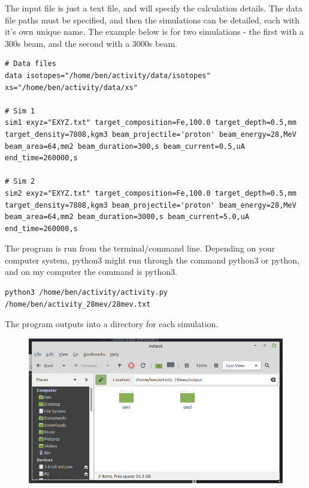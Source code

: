 \documentclass[12pt,twoside]{manual}
\begin{document}
The input file is just a text file, and will specify the calculation details.  The data file paths must be specified, and then the simulations can be detailed, each with it's own unique name.  The example below is for two simulations - the first with a 300s beam, and the second with a 3000s beam.



\FloatBarrier

\begin{lstlisting}[style=inputfile, caption={}]
# Data files
data isotopes="/home/ben/activity/data/isotopes" xs="/home/ben/activity/data/xs"

# Sim 1
sim1 exyz="EXYZ.txt" target_composition=Fe,100.0 target_depth=0.5,mm target_density=7808,kgm3 beam_projectile='proton' beam_energy=28,MeV beam_area=64,mm2 beam_duration=300,s beam_current=0.5,uA end_time=260000,s

# Sim 2
sim2 exyz="EXYZ.txt" target_composition=Fe,100.0 target_depth=0.5,mm target_density=7808,kgm3 beam_projectile='proton' beam_energy=28,MeV beam_area=64,mm2 beam_duration=3000,s beam_current=5.0,uA end_time=260000,s
\end{lstlisting}

\FloatBarrier

The program is run from the terminal/command line.  Depending on your computer system, python3 might run through the command python3 or python, and on my computer the command is python3.

\begin{lstlisting}[style=inputfile, caption={}]
python3 /home/ben/activity/activity.py /home/ben/activity_28mev/28mev.txt
\end{lstlisting}

\FloatBarrier

The program outputs into a directory for each simulation.

\begin{figure}[h]
  \begin{center}
    \includegraphics[scale=0.30]{img/output1}
  \end{center}
\end{figure}
\end{document}
